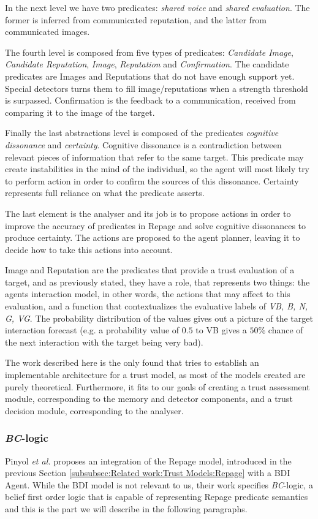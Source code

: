 In the next level we have two predicates: \textit{shared voice} and \textit{shared evaluation}. The former is inferred from communicated reputation, and the latter from communicated images. 

The fourth level is composed from five types of predicates: \textit{Candidate Image}, \textit{Candidate Reputation}, \textit{Image}, \textit{Reputation} and \textit{Confirmation}. The candidate predicates are Images and Reputations that do not have enough support yet. Special detectors turns them to fill image/reputations when a strength threshold is surpassed. Confirmation is the feedback to a communication, received from comparing it to the image of the target. 

Finally the last abstractions level is composed of the predicates \textit{cognitive dissonance} and \textit{certainty}. Cognitive dissonance is a contradiction between relevant pieces of information that refer to the same target. This predicate may create instabilities in the mind of the individual, so the agent will most likely try to perform action in order to confirm the sources of this dissonance. Certainty represents full reliance on what the predicate asserts.

The last element is the analyser and its job is to propose actions in order to improve the accuracy of predicates in Repage and solve cognitive dissonances to produce certainty. The actions are proposed to the agent planner, leaving it to decide how to take this actions into account.

Image and Reputation are the predicates that provide a trust evaluation of a target, and as previously stated, they have a role, that represents two things: the agents interaction model, in other words, the actions that may affect to this evaluation, and a function that contextualizes the evaluative labels of \textit{VB, B, N, G, VG}. The probability distribution of the values gives out a picture of the target interaction forecast (e.g. a probability value of $0.5$ to VB gives a $50\%$ chance of the next interaction with the target being very bad).

The work described here is the only found that tries to establish an implementable architecture for a trust model, as most of the models created are purely theoretical. Furthermore, it fits to our goals of creating a trust assessment module, corresponding to the memory and detector components, and a trust decision module, corresponding to the analyser.


\subsubsection{\textit{BC}-logic}
\label{subsubsec:Related work:Trust Models:BDI + Repage}
Pinyol \textit{et al.} \cite{Pinyol2009} proposes an integration of the Repage model, introduced in the previous Section \ref{subsubsec:Related work:Trust Models:Repage} with a BDI Agent\cite{Rao1995}. While the BDI model is not relevant to us, their work specifies \textit{BC}-logic, a belief first order logic that is capable of representing Repage predicate semantics and this is the part we will describe in the following paragraphs.

